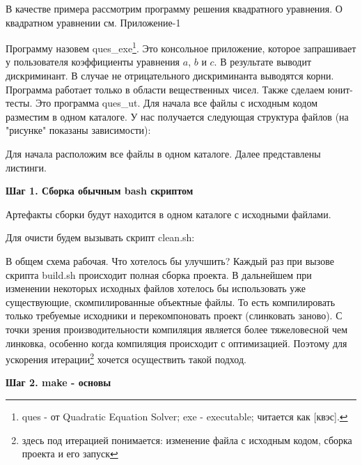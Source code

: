 В качестве примера рассмотрим программу решения квадратного уравнения. О квадратном уравнении см. Приложение-1

Программу назовем ques\_exe\footnote{ques - от Quadratic Equation Solver; exe - executable; читается как [квэс].}. Это консольное приложение, которое запрашивает у пользователя коэффициенты уравнения $a$, $b$ и $c$. В результате выводит дискриминант. В случае не отрицательного дискриминанта выводятся корни. Программа работает только в области вещественных чисел. Также сделаем юнит-тесты.  Это программа ques\_ut. Для начала все файлы с исходным кодом разместим в одном каталоге. У нас получается следующая структура файлов (на "рисунке" показаны зависимости):

\texttt{}

Для начала расположим все файлы в одном каталоге. Далее представлены листинги.








\textbf{Шаг 1. Сборка обычным bash скриптом}

Артефакты сборки будут находится в одном каталоге с исходными файлами.



Для очисти будем вызывать скрипт clean.sh:



В общем схема рабочая. Что хотелось бы улучшить? Каждый раз при вызове скрипта build.sh происходит полная сборка проекта. В дальнейшем при изменении некоторых исходных файлов хотелось бы использовать уже существующие, скомпилированные объектные файлы. То есть компилировать только требуемые исходники и перекомпоновать проект (слинковать заново). С точки зрения производительности компиляция является более тяжеловесной чем линковка, особенно когда компиляция происходит с оптимизацией. Поэтому для ускорения итерации\footnote{здесь под итерацией понимается: изменение файла с исходным кодом, сборка проекта и его запуск} хочется осуществить такой подход.

\textbf{Шаг 2. make - основы}

